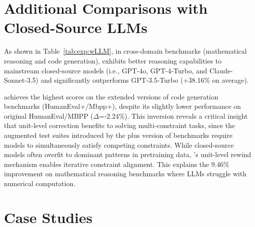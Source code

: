 \section{Additional Comparisons with Closed-Source LLMs}\label{app:exp:close-source}

As shown in Table~\ref{tab:exp:wLLM}, in cross-domain benchmarks (mathematical reasoning and code generation), \tool exhibits better reasoning capabilities to mainstream closed-source models (i.e., GPT-4o, GPT-4-Turbo, and Claude-Sonnet-3.5) and significantly outperforms GPT-3.5-Turbo (+38.16\% on average).

\tool achieves the highest scores on the extended versions of code generation benchmarks (HumanEval+/Mbpp+), despite its slightly lower performance on original HumanEval/MBPP ($\Delta$=-2.24\%).
This inversion reveals a critical insight that unit-level correction benefits to solving multi-constraint tasks, since the augmented test suites introduced by the plus version of benchmarks require models to simultaneously satisfy competing constraints.
While closed-source models often overfit to dominant patterns in pretraining data, \tool's unit-level rewind mechanism enables iterative constraint alignment. This explains the 9.46\% improvement on mathematical reasoning benchmarks where LLMs struggle with numerical computation.




\section{Case Studies}\label{app:case}
